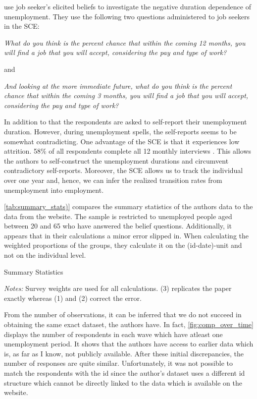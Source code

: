 \documentclass[11pt,a4paper,leqno]{article}
\begin{document}

\textcite{MST2021} use job seeker's elicited beliefs to investigate the negative duration dependence of unemployment. They use the following two questions administered to job seekers in the SCE:
\begin{center}
	\textit{What do you think is the percent chance that within the coming 12 months, you will find a job that you will accept, considering the pay and type of work?}
\end{center}
and
\begin{center}
	\textit{And looking at the more immediate future, what do you think is the percent chance that within the coming 3 months, you will find a job that you will accept, considering the pay and type of work?}
\end{center}

In addition to that the respondents are asked to self-report their unemployment duration. However, during unemployment spells, the self-reports seems to be somewhat contradicting. 
 One advantage of the SCE is that it experiences low attrition. 58\% of all respondents complete all 12 monthly interviews \parencite{SCEOverview}. This allows the authors to self-construct the unemployment durations and circumvent contradictory self-reports. Moreover, the SCE allows us to track the individual over one year and, hence, we can infer the realized transition rates from unemployment into employment. 
 
 \autoref{tab:summary_stats)} compares the summary statistics of the authors data to the data from the website. The sample is restricted to unemployed people aged between 20 and 65 who have answered the belief questions. Additionally, it appears that in their calculations a minor error slipped in. When calculating the weighted proportions of the groups, they calculate it on the (id-date)-unit and not on the individual level. 
 
    \begin{table}[!htbp] 
    \centering 
	\caption{Summary Statistics}
	\label{tab:summary_stats} 
 	
 	\tiny
 	\textit{Notes:} Survey weights are used for all calculations. (3) replicates the paper exactly whereas (1) and (2) correct the error.
	\end{table}
 From the number of observations, it can be inferred that we do not succeed in obtaining the same exact dataset, the authors have.  In fact, \autoref{fig:comp_over_time} displays the number of respondents in each wave which have atleast one unemployment period. It shows that the authors have access to earlier data which is, as far as I know, not publicly available. After these initial discrepancies, the number of responses are quite similar. Unfortunately, it was not possible to match the respondents with the id since the author's dataset uses a different id structure which cannot be directly linked to the data which is available on the website.   
\end{document}
